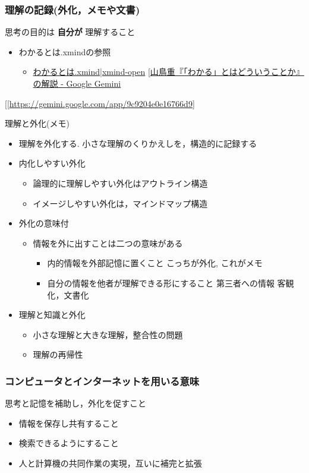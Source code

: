 \documentclass[dvipdfmx,11pat]{jarticle}
\begin{document}
\subsubsection{理解の記録(外化，メモや文書)}
\label{sec:orgd43a230}
思考の目的は \textbf{自分が} 理解すること
\begin{itemize}
\item わかるとは.xmindの参照
\begin{itemize}
\item \href{../Maps/わかるとは.xmind}{わかるとは.xmind}|\href{shell:xmind  ../Maps/わかるとは.xmind}{xmind-open}
\href{https://share.gemini.google/Rbj3gEgpBt7q}{{[}山鳥重『「わかる」とはどういうことか』の解説 - Google Gemini}
\end{itemize}
\end{itemize}
{[}[\url{https://gemini.google.com/app/9c9204e0e16766d9}]

理解と外化(メモ)  
\begin{itemize}
\item 理解を外化する. 小さな理解のくりかえしを，構造的に記録する
\item 内化しやすい外化
\begin{itemize}
\item 論理的に理解しやすい外化はアウトライン構造
\item イメージしやすい外化は，マインドマップ構造
\end{itemize}
\item 外化の意味付
\begin{itemize}
\item 情報を外に出すことは二つの意味がある
\begin{itemize}
\item 内的情報を外部記憶に置くこと
こっちが外化, これがメモ
\item 自分の情報を他者が理解できる形にすること
第三者への情報 客観化，文書化
\end{itemize}
\end{itemize}
\item 理解と知識と外化
\begin{itemize}
\item 小さな理解と大きな理解，整合性の問題
\item 理解の再帰性
\end{itemize}
\end{itemize}
\subsubsection{コンピュータとインターネットを用いる意味}
\label{sec:org0a94f22}
思考と記憶を補助し，外化を促すこと
\begin{itemize}
\item 情報を保存し共有すること
\item 検索できるようにすること
\item 人と計算機の共同作業の実現，互いに補完と拡張
\end{itemize}
\end{document}
